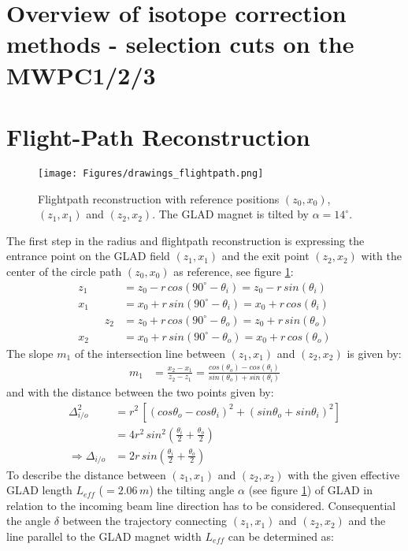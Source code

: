 \begin{appendices}
\section {Overview of isotope correction methods - selection cuts on the MWPC1/2/3}

\section{Flight-Path Reconstruction}\label{app:flightpath}
\begin{figure}[h!]
    \centering
    \texttt{[image: Figures/drawings\_flightpath.png]}
    \caption{
        Flightpath reconstruction with reference positions $(z_0,x_0)$, $(z_1,x_1)$ and $(z_2,x_2)$. The GLAD magnet is tilted by $\alpha = 14^{\circ}$.}
    \label{fig:draw_flight}
\end{figure}
The first step in the radius and flightpath reconstruction is expressing the entrance point on the GLAD field $(z_1,x_1)$ and the exit point $(z_2,x_2)$ with the center of the circle path $(z_0,x_0)$ as reference, see figure \ref{fig:draw_flight}:
\begin{align*}
z_1 &= z_0 -r\,cos(90^{\circ}-\theta_i) = z_0 -r\,sin(\theta_i)\\
x_1 &= x_0 + r\,sin(90^{\circ}-\theta_i) = x_0 + r\,cos(\theta_i)\\
\hspace{1cm}
z_2 &= z_0 + r\,cos(90^{\circ}-\theta_o) = z_0 + r\,sin(\theta_o)\\
x_2 &= x_0 + r\,sin(90^{\circ}-\theta_o) = x_0 + r\,cos(\theta_o) 
\end{align*}
The slope $m_1$ of the intersection line between $(z_1,x_1)$ and $(z_2,x_2)$ is given by:
\begin{align*}
m_1 &= \frac{x_2-x_1}{z_2 -z_1} = \frac{cos(\theta_o) - cos(\theta_i)}{sin(\theta_o)+sin(\theta_i)}
\end{align*}
and with the distance between the two points given by:
\begin{align*}
\Delta^2_{i/o} &= r^2 \, \left[(cos\theta_o - cos\theta_i)^2 + (sin\theta_o + sin\theta_i)^2 \right]\\
	       &= 4r^2\,sin^2(\frac{\theta_i}{2} +\frac{\theta_o}{2} )\\
\Rightarrow \Delta_{i/o} &= 2r\,sin(\frac{\theta_i}{2} +\frac{\theta_o}{2})
\end{align*}
To describe the distance between $(z_1,x_1)$ and $(z_2,x_2)$ with the given effective GLAD length $L_{eff}$ ($= 2.06\,m$) the tilting angle $\alpha$ (see figure \ref{fig:draw_flight}) of GLAD in relation to the incoming beam line direction has to be considered. Consequential the angle $\delta$ between the trajectory connecting $(z_1,x_1)$ and $(z_2,x_2)$ and the line parallel to the GLAD magnet width $L_{eff}$ can be determined as:

\end{appendices}
